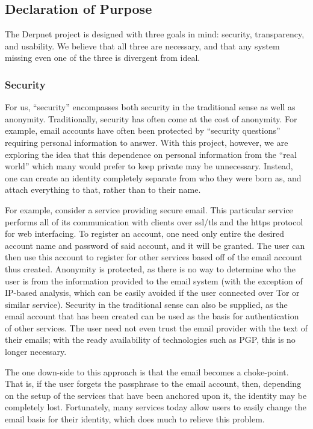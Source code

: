 \documentclass[11pt]{article}
\begin{document}
\subsection{Declaration of Purpose}

The Derpnet project is designed with three goals in mind: security,
transparency, and usability.  We believe that all three are necessary, and
that any system missing even one of the three is divergent from ideal.

\subsubsection{Security}

For us, ``security'' encompasses both security in the traditional sense as
well as anonymity.  Traditionally, security has often come at the cost of
anonymity.  For example, email accounts have often been protected by
``security questions'' requiring personal information to answer.  With this
project, however, we are exploring the idea that this dependence on personal
information from the ``real world'' which many would prefer to keep private
may be unnecessary.  Instead, one can create an identity completely separate
from who they were born as, and attach everything to that, rather than to
their name.

For example, consider a service providing secure email.  This particular
service performs all of its communication with clients over ssl/tls and the
https protocol for web interfacing.  To register an account, one need only
entire the desired account name and password of said account, and it will be
granted.  The user can then use this account to register for other services
based off of the email account thus created.  Anonymity is protected, as there
is no way to determine who the user is from the information provided to the
email system (with the exception of IP-based analysis, which can be easily
avoided if the user connected over Tor or similar service).  Security in the
traditional sense can also be supplied, as the email account that has been
created can be used as the basis for authentication of other services.  The
user need not even trust the email provider with the text of their emails;
with the ready availability of technologies such as PGP, this is no longer
necessary.

The one down-side to this approach is that the email becomes a choke-point.
That is, if the user forgets the passphrase to the email account, then,
depending on the setup of the services that have been anchored upon it, the
identity may be completely lost.  Fortunately, many services today allow users
to easily change the email basis for their identity, which does much to
relieve this problem.
\end{document}
